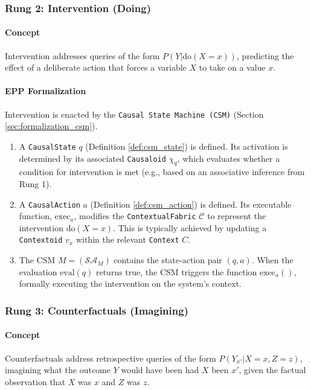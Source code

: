 \subsubsection*{Rung 2: Intervention (Doing)}
\label{sssec:mapping_pearl_rung2}

\paragraph{Concept}
Intervention addresses queries of the form \(P(Y|\text{do}(X=x))\), predicting the effect of a deliberate action that forces a variable \(X\) to take on a value \(x\).

\paragraph{EPP Formalization}
Intervention is enacted by the \texttt{Causal State Machine (CSM)} (Section \ref{sec:formalization_csm}).
\begin{enumerate}
    \item A \texttt{CausalState} \(q\) (Definition \ref{def:csm_state}) is defined. Its activation is determined by its associated \texttt{Causaloid} \(\chi_q\), which evaluates whether a condition for intervention is met (e.g., based on an associative inference from Rung 1).
    \item A \texttt{CausalAction} \(a\) (Definition \ref{def:csm_action}) is defined. Its executable function, \(\text{exec}_a\), modifies the \texttt{ContextualFabric} \(\mathcal{C}\) to represent the intervention \(\text{do}(X=x)\). This is typically achieved by updating a \texttt{Contextoid} \(v_x\) within the relevant \texttt{Context} \(C\).
    \item The CSM \(M = (\mathcal{SA}_M)\) contains the state-action pair \((q, a)\). When the evaluation \(\text{eval}(q)\) returns \(\text{true}\), the CSM triggers the function \(\text{exec}_a()\), formally executing the intervention on the system's context.
\end{enumerate}

\subsubsection*{Rung 3: Counterfactuals (Imagining)}
\label{sssec:mapping_pearl_rung3}

\paragraph{Concept}
Counterfactuals address retrospective queries of the form \(P(Y_{x'} | X=x, Z=z)\), imagining what the outcome \(Y\) would have been had \(X\) been \(x'\), given the factual observation that \(X\) was \(x\) and \(Z\) was \(z\).

